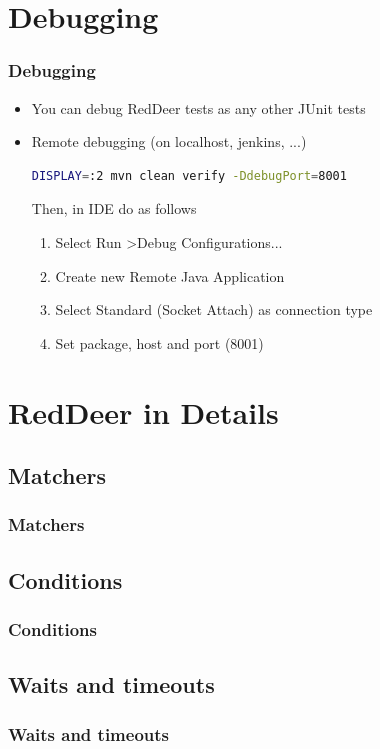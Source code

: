 \documentclass{beamer}
\begin{document}
\section{Debugging}
\begin{frame}[fragile]
\frametitle{Debugging}
\begin{itemize}
\item You can debug RedDeer tests as any other JUnit tests
\item Remote debugging (on localhost, jenkins, ...)
\begin{lstlisting}[language=sh]
DISPLAY=:2 mvn clean verify -DdebugPort=8001
\end{lstlisting}
Then, in IDE do as follows
\begin{enumerate}
\item Select Run \textgreater Debug Configurations...
\item Create new Remote Java Application
\item Select Standard (Socket Attach) as connection type
\item Set package, host and port (8001)
\end{enumerate}
\end{itemize}
\end{frame}


\section{RedDeer in Details}

\subsection{Matchers}
\begin{frame}[fragile]
\frametitle{Matchers}
\end{frame}

\subsection{Conditions}
\begin{frame}[fragile]
\frametitle{Conditions}
\end{frame}

\subsection{Waits and timeouts}
\begin{frame}[fragile]
\frametitle{Waits and timeouts}
\end{frame}
\end{document}
